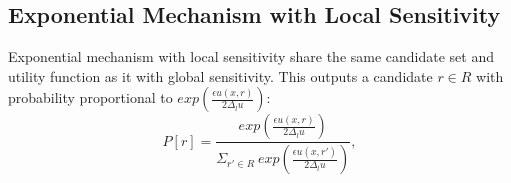 


\subsection{Exponential Mechanism with Local Sensitivity}
\label{subsec_emls}
Exponential mechanism with local sensitivity share the same candidate set and utility function as it with global sensitivity. This outputs a candidate $r \in R$ with probability proportional to $exp(\frac{\epsilon u(x,r)}{2 \Delta_{l}u})$:
\begin{equation*}
P[r] = \frac
{exp(\frac{\epsilon u(x,r)}{2 \Delta_{l}u})}
{\Sigma_{r' \in R}\ exp(\frac{\epsilon u(x,r')}{2 \Delta_{l}u})},
\end{equation*}

